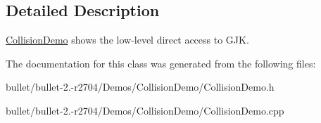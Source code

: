 \subsection{Detailed Description}
\hyperlink{class_collision_demo}{Collision\+Demo} shows the low-\/level direct access to G\+J\+K. 

The documentation for this class was generated from the following files\+:\begin{DoxyCompactItemize}
\item 
bullet/bullet-\/2.-\/r2704/\+Demos/\+Collision\+Demo/Collision\+Demo.\+h\item 
bullet/bullet-\/2.-\/r2704/\+Demos/\+Collision\+Demo/Collision\+Demo.\+cpp\end{DoxyCompactItemize}
